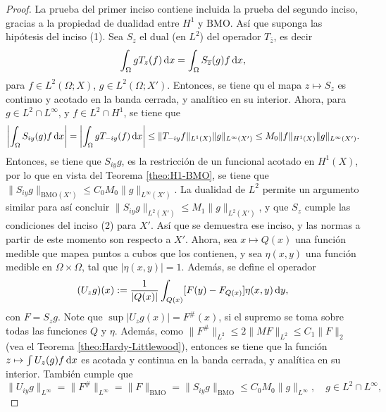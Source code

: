 \begin{proof}
	La prueba del primer inciso contiene incluida la prueba del segundo inciso, gracias a la propiedad de dualidad entre $H^1$ y $\mathrm{BMO}$. Así que suponga las hipótesis del inciso (1). Sea $S_z$ el dual (en $L^2$) del operador $T_{\overline{z}}$, es decir
	\begin{equation*}
		\int_{\Omega} gT_z(f) \mathop{}\!\mathrm{d} x = \int_{\Omega} {S_{\overline{z}}(g)} f\mathop{}\!\mathrm{d} x,
	\end{equation*}
	para $f\in L^2(\Omega;X)$, $g\in L^2(\Omega;X')$. Entonces, se tiene qu el mapa $z\mapsto S_z$ es continuo y acotado en la banda cerrada, y analítico en su interior. Ahora, para $g\in L^2\cap L^\infty$, y $f \in L^2\cap H^1$, se tiene que 
	\begin{equation*}
		\left| \int_{\Omega} S_{iy}(g)f \mathop{}\!\mathrm{d} x 
		\right| = 	\left| \int_{\Omega} g{T_{-iy}(f)}  \mathop{}\!\mathrm{d} x 
		\right| \leq \|T_{-iy}f\|_{L^1(X)}\|g\|_{L^\infty(X')} \leq M_0 \|f\|_{H^1(X)}\|g\|_{L^\infty(X')}.
	\end{equation*}
	Entonces, se tiene que $S_{iy}g$, es la restricción de un funcional acotado en $H^1(X)$, por lo que en vista del Teorema \ref{theo:H1-BMO}, se tiene que $\|S_{iy}g\|_{\mathrm{BMO}(X')}  \leq  C_0M_0\|g\|_{L^\infty(X')}$. La dualidad de $L^2$ permite un argumento similar para así concluir $\|S_{iy}g\|_{L^2(X')}  \leq  M_1\|g\|_{L^2(X')}$, y que $S_z$ cumple las condiciones del inciso (2) para $X'$. Así que se demuestra ese inciso, y las normas a partir de este momento son respecto a $X'$. Ahora, sea $x\mapsto Q(x)$ una función medible que mapea puntos a cubos que los contienen, y sea $\eta(x, y)$ una función medible en $\Omega\times\Omega$, tal que  $|\eta(x, y)|=1$. Además, se define el operador 
	\begin{equation*}
		(U_zg)(x) := \frac{1}{|Q(x)|} \int_{Q(x)} [F(y) - F_{Q(x)}]\eta(x, y) \mathop{}\!\mathrm{d} y, 
	\end{equation*}
	con $F=S_zg$. Note que $\sup|U_zg(x)| = F^\#(x)$, si el supremo se toma sobre todas las funciones $Q$ y $\eta$. Además, como $\|F^\#\|_{L^2} \leq 2\|MF\|_{L^2} \leq C_1\|F\|_2$ (vea el Teorema \ref{theo:Hardy-Littlewood}), entonces se tiene que la función $z\mapsto \int U_z(g)f\mathop{}\!\mathrm{d} x$ es acotada y continua en la banda cerrada, y analítica en su interior. También cumple que 
	\begin{equation*}
		\|U_{iy} g\|_{L^\infty} = \|F^\#\|_{L^\infty} = \|F\|_{\mathrm{BMO}} = \|S_{iy}g\|_{\mathrm{BMO}}  \leq C_0M_0 \|g\|_{L^\infty}, \quad g\in L^2\cap L^\infty,
	\end{equation*}

\end{proof}
